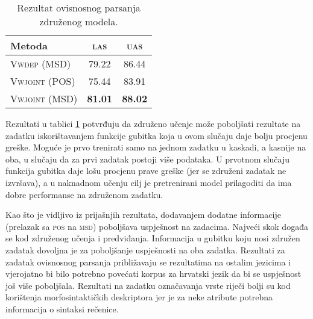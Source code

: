 \begin{table}
\centering
\caption{Rezultat ovisnosnog parsanja združenog modela.}
\label{table:depparsing:joint}
\begin{tabular}{|l|c|c|}
\hline
Metoda                 & \textsc{las}   & \textsc{uas}    \\ \hline \hline
\textsc{Vwdep}   (MSD) & 79.22          & 86.44           \\
\textsc{Vwjoint} (POS) & 75.44          & 83.91           \\
\textsc{Vwjoint} (MSD) & \textbf{81.01} & \textbf{88.02}  \\ \hline
\end{tabular}
\end{table}

Rezultati u tablici \ref{table:depparsing:joint} potvrđuju da združeno učenje
može poboljšati rezultate na zadatku iskorištavanjem funkcije gubitka koja u
ovom slučaju daje bolju procjenu greške. Moguće je prvo trenirati samo na jednom
zadatku u kaskadi, a kasnije na oba, u slučaju da za prvi zadatak postoji više
podataka. U prvotnom slučaju funkcija gubitka daje lošu procjenu prave greške
(jer se združeni zadatak ne izvršava), a u naknadnom učenju cilj je pretrenirani
model prilagoditi da ima dobre performanse na združenom zadatku.

Kao što je vidljivo iz prijašnjih rezultata, dodavanjem dodatne informacije
(prelazak sa \textsc{pos} na \textsc{msd}) poboljšava uspješnost na zadacima.
Najveći skok događa se kod združenog učenja i predviđanja. Informacija u gubitku
koju nosi združen zadatak dovoljna je za poboljšanje uspješnosti na oba zadatka.
Rezultati za zadatak ovisnosnog parsanja približavaju se rezultatima na ostalim
jezicima i vjerojatno bi bilo potrebno povećati korpus za hrvatski jezik da bi
se uspješnost još više poboljšala. Rezultati na zadatku označavanja vrste riječi
bolji su kod korištenja morfosintaktičkih deskriptora jer je za neke atribute
potrebna informacija o sintaksi rečenice.
